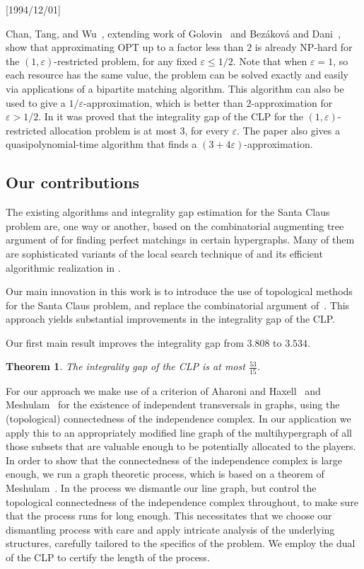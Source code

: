 \NeedsTeXFormat{LaTeX2e}[1994/12/01]\documentclass[letterpaper, 11pt]{article}
\newtheorem{thm}{Theorem}[section]
\theoremstyle{definition}
\theoremstyle{remark}
\numberwithin{equation}{section}
\begin{document}
Chan, Tang, and Wu~\cite{chantangwu}, extending work of
Golovin~\cite{golovin} and Bez\'akov\'a and Dani~\cite{bezakovadani},
show that approximating OPT  up to a factor less than $2$ is already
NP-hard for the $(1,\varepsilon)$-restricted problem, for any fixed
$\varepsilon \leq 1/2$. 
Note that when $\varepsilon =1 $, so each resource has the same value,
the problem can be solved
exactly and easily via applications of a bipartite matching
algorithm. This algorithm can also be used to give a
$1/\varepsilon$-approximation, which is better than $2$-approximation for
$\varepsilon >1/2$. In
\cite{chantangwu} it was proved that the integrality gap
of the CLP for the $(1,\varepsilon)$-restricted allocation problem is at
most $3$, for every $\varepsilon$. The paper also gives a quasipolynomial-time
algorithm that finds a $(3+4\varepsilon)$-approximation.

\subsection{Our contributions}

The existing algorithms and integrality gap estimation for the Santa
Claus problem are, one way or another, based on the combinatorial augmenting tree
argument of \cite{haxell} for finding perfect matchings in certain
hypergraphs. Many of them are sophisticated variants
of the local search technique of \cite{asadpourfeigesaberi} 
and its efficient algorithmic realization in \cite{annakalasven}.

Our main innovation in this work is to introduce the use of
topological methods for the Santa Claus problem, and replace the combinatorial
argument of~\cite{haxell}. 
This approach yields substantial 
improvements in the integrality gap of the CLP. 

Our first main result improves the integrality gap from $3.808$ to $3.534$. 
\begin{thm}\label{thm:main-intro} The integrality gap of the CLP is
  at most $\frac{53}{15}$. 
\end{thm}

For our approach we make use of a criterion of Aharoni and
Haxell~\cite{aharonihaxell} and Meshulam~\cite{meshulam2} for the
existence of independent transversals in
graphs, using the (topological) connectedness of the
independence complex. In our application we apply this to an appropriately modified
line graph of the multihypergraph of all those subsets that are
valuable enough to be potentially allocated to the players. In order to show that the connectedness
of the independence complex is large enough, we run a graph theoretic
process, which is based on a theorem of Meshulam~\cite{meshulam2}.
In the process we dismantle our line graph, but control the topological
connectedness of the independence complex throughout, to make sure
that the process runs for long enough. This necessitates that we choose
our dismantling process with care and apply intricate analysis of the underlying
structures, carefully tailored to the specifics of the problem. We
employ the dual of the CLP to certify the length of the process. 
\end{document}
